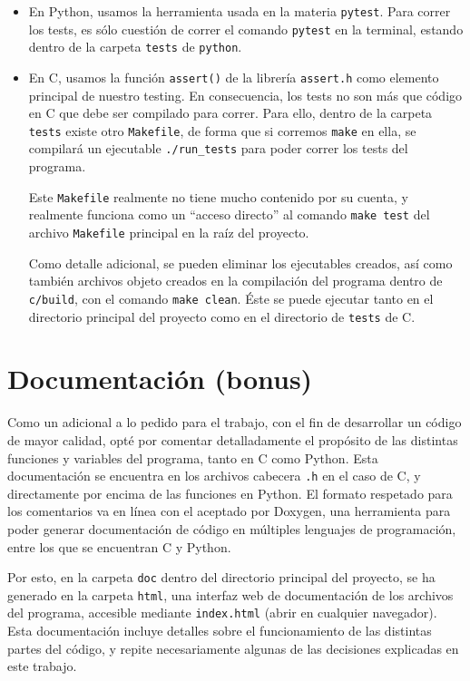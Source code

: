 \documentclass[a4paper]{article}
\begin{document}
\begin{itemize}
    \item En Python, usamos la herramienta usada en la materia \texttt{pytest}. Para correr los tests, es sólo cuestión de correr el comando \texttt{pytest} en la terminal, estando dentro de la carpeta \texttt{tests} de \texttt{python}.
    \item En C, usamos la función \texttt{assert()} de la librería \texttt{assert.h} como elemento principal de nuestro testing. En consecuencia, los tests no son más que código en C que debe ser compilado para correr. Para ello, dentro de la carpeta \texttt{tests} existe otro \texttt{Makefile}, de forma que si corremos \texttt{make} en ella, se compilará un ejecutable \texttt{./run\_tests} para poder correr los tests del programa.

        Este \texttt{Makefile} realmente no tiene mucho contenido por su cuenta, y realmente funciona como un ``acceso directo'' al comando \texttt{make test} del archivo \texttt{Makefile} principal en la raíz del proyecto.

        Como detalle adicional, se pueden eliminar los ejecutables creados, así como también archivos objeto creados en la compilación del programa dentro de \texttt{c/build}, con el comando \texttt{make clean}. Éste se puede ejecutar tanto en el directorio principal del proyecto como en el directorio de \texttt{tests} de C.
\end{itemize}

\section{Documentación (bonus)}

Como un adicional a lo pedido para el trabajo, con el fin de desarrollar un código de mayor calidad, opté por comentar detalladamente el propósito de las distintas funciones y variables del programa, tanto en C como Python. Esta documentación se encuentra en los archivos cabecera \texttt{.h} en el caso de C, y directamente por encima de las funciones en Python. El formato respetado para los comentarios va en línea con el aceptado por Doxygen, una herramienta para poder generar documentación de código en múltiples lenguajes de programación, entre los que se encuentran C y Python. 

Por esto, en la carpeta \texttt{doc} dentro del directorio principal del proyecto, se ha generado en la carpeta \texttt{html}, una interfaz web de documentación de los archivos del programa, accesible mediante \texttt{index.html} (abrir en cualquier navegador). Esta documentación incluye detalles sobre el funcionamiento de las distintas partes del código, y repite necesariamente algunas de las decisiones explicadas en este trabajo.
\end{document}

